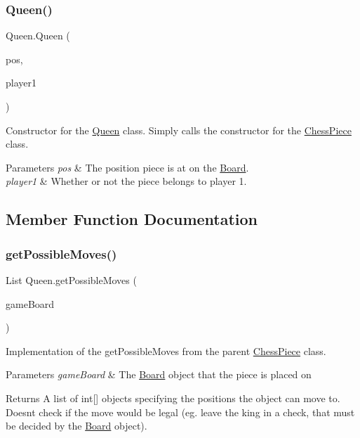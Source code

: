 \subsubsection{\texorpdfstring{Queen()}{Queen()}}
{\footnotesize\ttfamily Queen.\+Queen (\begin{DoxyParamCaption}\item[{@Not\+Null int \mbox{[}$\,$\mbox{]}}]{pos,  }\item[{boolean}]{player1 }\end{DoxyParamCaption})}

Constructor for the \mbox{\hyperlink{class_queen}{Queen}} class. Simply calls the constructor for the \mbox{\hyperlink{class_chess_piece}{Chess\+Piece}} class. 
\begin{DoxyParams}{Parameters}
{\em pos} & The position piece is at on the \mbox{\hyperlink{class_board}{Board}}. \\
\hline
{\em player1} & Whether or not the piece belongs to player 1. \\
\hline
\end{DoxyParams}


\subsection{Member Function Documentation}
\mbox{\label{class_queen_ab68db1ab8ecf2b0a85da2f824580ce82}} 
\subsubsection{\texorpdfstring{get\+Possible\+Moves()}{getPossibleMoves()}}
{\footnotesize\ttfamily List Queen.\+get\+Possible\+Moves (\begin{DoxyParamCaption}\item[{@Not\+Null \mbox{\hyperlink{class_board}{Board}}}]{game\+Board }\end{DoxyParamCaption})}

Implementation of the get\+Possible\+Moves from the parent \mbox{\hyperlink{class_chess_piece}{Chess\+Piece}} class. 
\begin{DoxyParams}{Parameters}
{\em game\+Board} & The \mbox{\hyperlink{class_board}{Board}} object that the piece is placed on \\
\hline
\end{DoxyParams}
\begin{DoxyReturn}{Returns}
A list of int\mbox{[}\mbox{]} objects specifying the positions the object can move to. Doesn\textquotesingle{}t check if the move would be legal (eg. leave the king in a check, that must be decided by the \mbox{\hyperlink{class_board}{Board}} object). 
\end{DoxyReturn}
\mbox{\label{class_queen_aa646ca2f6eaf8012ff508f778389186d}} 
